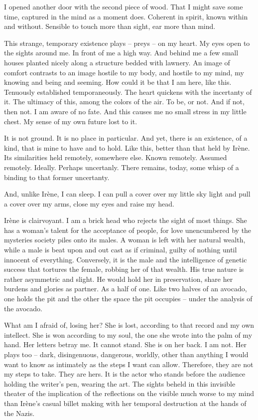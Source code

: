 I opened another door with the second piece of wood.  That I might
save some time, captured in the mind as a moment does.  Coherent in
spirit, known within and without.  Sensible to touch more than sight,
ear more than mind.

This strange, temporary existence plays -- preys -- on my heart.  My
eyes open to the sights around me.  In front of me a high way.  And
behind me a few small houses planted nicely along a structure bedded
with lawnery.  An image of comfort contrasts to an image hostile to my
body, and hostile to my mind, my knowing and being and seeming.  How
could it be that I am here, like this.  Tenuously established
temporaneously.  The heart quickens with the incertanty of it.  The
ultimacy of this, among the colors of the air.  To be, or not.  And if
not, then not.  I am aware of no fate.  And this causes me no small
stress in my little chest.  My sense of my own future lost to it.

It is not ground.  It is no place in particular.  And yet, there is an
existence, of a kind, that is mine to have and to hold.  Like this,
better than that held by Ir\`{e}ne.  Its similarities held remotely,
somewhere else.  Known remotely.  Assumed remotely.  Ideally.  Perhaps
uncertanly.  There remains, today, some whisp of a binding to that
former uncertanty.

And, unlike Ir\`{e}ne, I can sleep.  I can pull a cover over my little sky
light and pull a cover over my arms, close my eyes and raise my head.

\vfill
\break

﻿Ir\`{e}ne is clairvoyant.  I am a brick head who rejects the sight of most
things.  She has a woman's talent for the acceptance of people, for
love unencumbered by the mysteries society piles onto its males.  A
woman is left with her natural wealth, while a male is beat upon and
out cast as if criminal, guilty of nothing until innocent of
everything.  Conversely, it is the male and the intelligence of
genetic success that tortures the female, robbing her of that wealth.
His true nature is rather asymmetric and slight.  He would hold her in
preservation, share her burdens and glories as partner.  As a half of
one.  Like two halves of an avocado, one holds the pit and the other
the space the pit occupies -- under the analysis of the avocado.

What am I afraid of, losing her?  She is lost, according to that
record and my own intellect.  She is won according to my soul, the one
she wrote into the palm of my hand.  Her letters betray me.  It cannot
stand.  She is on her back.  I am not.  Her plays too -- dark,
disingenuous, dangerous, worldly, other than anything I would want to
know as intimately as the steps I want can allow.  Therefore, they are
not my steps to take.  They are hers.  It is the actor who stands
before the audience holding the writer's pen, wearing the art.  The
sights beheld in this invisible theater of the implication of the
reflections on the visible much worse to my mind than Ir\`{e}ne's
casual billet making with her temporal destruction at the hands of the
Nazis.

